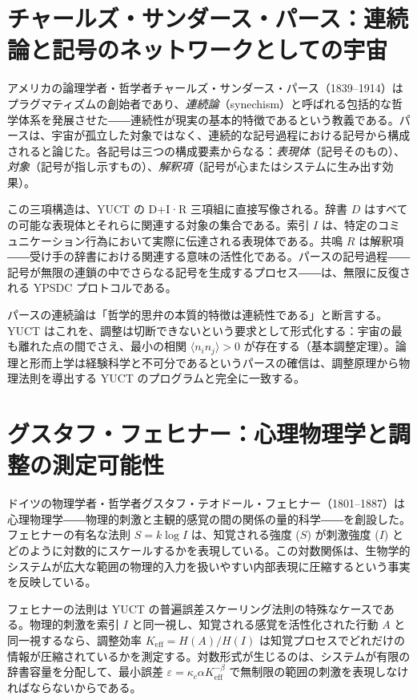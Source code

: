 \documentclass[12pt,a4paper]{article}
\begin{document}
	\section{チャールズ・サンダース・パース：連続論と記号のネットワークとしての宇宙}
	
	アメリカの論理学者・哲学者チャールズ・サンダース・パース（1839–1914）はプラグマティズムの創始者であり、\emph{連続論}（synechism）と呼ばれる包括的な哲学体系を発展させた――連続性が現実の基本的特徴であるという教義である。パースは、宇宙が孤立した対象ではなく、連続的な記号過程における記号から構成されると論じた。各記号は三つの構成要素からなる：\emph{表現体}（記号そのもの）、\emph{対象}（記号が指し示すもの）、\emph{解釈項}（記号が心またはシステムに生み出す効果）。
	
	この三項構造は、YUCT の D+I·R 三項組に直接写像される。辞書 \(D\) はすべての可能な表現体とそれらに関連する対象の集合である。索引 \(I\) は、特定のコミュニケーション行為において実際に伝達される表現体である。共鳴 \(R\) は解釈項――受け手の辞書における関連する意味の活性化である。パースの記号過程――記号が無限の連鎖の中でさらなる記号を生成するプロセス――は、無限に反復される YPSDC プロトコルである。
	
	パースの連続論は「哲学的思弁の本質的特徴は連続性である」と断言する。YUCT はこれを、調整は切断できないという要求として形式化する：宇宙の最も離れた点の間でさえ、最小の相関 \(\langle n_i n_j \rangle > 0\) が存在する（基本調整定理）。論理と形而上学は経験科学と不可分であるというパースの確信は、調整原理から物理法則を導出する YUCT のプログラムと完全に一致する。
	
	\section{グスタフ・フェヒナー：心理物理学と調整の測定可能性}
	
	ドイツの物理学者・哲学者グスタフ・テオドール・フェヒナー（1801–1887）は心理物理学――物理的刺激と主観的感覚の間の関係の量的科学――を創設した。フェヒナーの有名な法則 \(S = k \log I\) は、知覚される強度 (\(S\)) が刺激強度 (\(I\)) とどのように対数的にスケールするかを表現している。この対数関係は、生物学的システムが広大な範囲の物理的入力を扱いやすい内部表現に圧縮するという事実を反映している。
	
	フェヒナーの法則は YUCT の普遍誤差スケーリング法則の特殊なケースである。物理的刺激を索引 \(I\) と同一視し、知覚される感覚を活性化された行動 \(A\) と同一視するなら、調整効率 \(K_{\mathrm{eff}} = H(A)/H(I)\) は知覚プロセスでどれだけの情報が圧縮されているかを測定する。対数形式が生じるのは、システムが有限の辞書容量を分配して、最小誤差 \(\varepsilon = \kappa_c \alpha K_{\mathrm{eff}}^{-\beta}\) で無制限の範囲の刺激を表現しなければならないからである。
	
\end{document}
